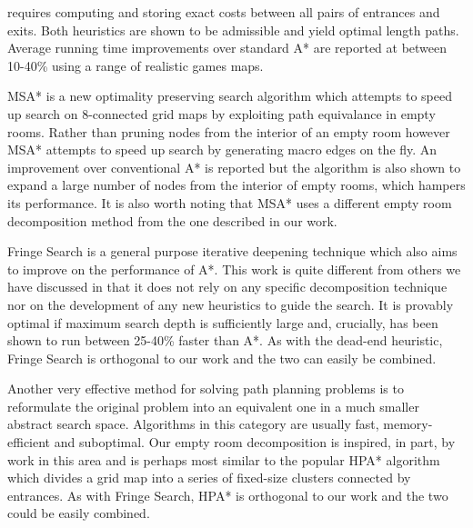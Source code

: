 requires computing and storing exact costs between all pairs of entrances and exits.
Both heuristics are shown to be admissible and yield optimal length paths. 
Average running time improvements over standard A* are reported at between 10-40\% using a range of
realistic games maps.
\par
MSA* \cite{bolanca09} is a new optimality preserving search algorithm which attempts to speed up search 
on 8-connected grid maps by exploiting path equivalance in empty rooms. 
Rather than pruning nodes from the interior of an empty room however MSA* attempts to speed up 
search by generating macro edges on the fly.
An improvement over conventional A* is reported but the algorithm is also
shown to expand a large number of nodes from the interior of empty rooms, which hampers its performance.
It is also worth noting that MSA* uses a different empty room decomposition method
from the one described in our work.
\par
Fringe Search \cite{bjornsson06} is a general purpose iterative deepening technique which also
aims to improve on the performance of A*.
This work is quite different from others we have discussed in that it does not
rely on any specific decomposition technique nor on the development of any new heuristics
to guide the search.
It is provably optimal if maximum search depth is sufficiently large and, crucially, has been shown to 
run between 25-40\% faster than A*.
As with the dead-end heuristic, Fringe Search is orthogonal to our work and the two
can easily be combined.
\par
Another very effective method for solving path planning problems is to reformulate the original problem
into an equivalent one in a much smaller abstract search space. 
Algorithms in this category are usually fast, memory-efficient and suboptimal.
Our empty room decomposition is inspired, in part, by work in this area and is perhaps most similar to 
the popular HPA* algorithm \cite{botea04} 
which divides a grid map into a series of fixed-size clusters connected 
by entrances.
As with Fringe Search, HPA* is orthogonal to our work and the two could be easily combined.
